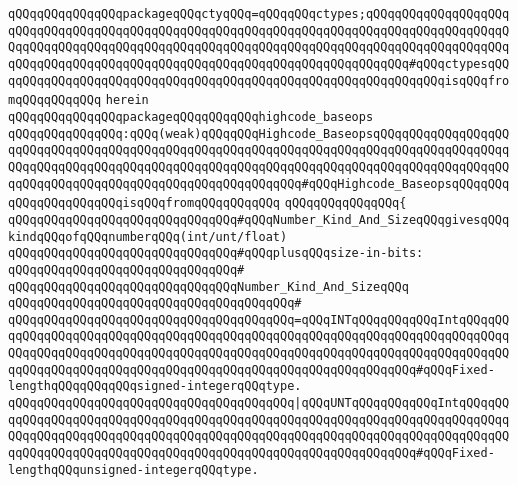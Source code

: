 \verb|qQQqqQQqqQQqqQQqpackageqQQqctyqQQq=qQQqqQQqctypes;qQQqqQQqqQQqqQQqqQQqqQQqqQQqqQQqqQQqqQQqqQQqqQQqqQQqqQQqqQQqqQQqqQQqqQQqqQQqqQQqqQQqqQQqqQQqqQQqqQQqqQQqqQQqqQQqqQQqqQQqqQQqqQQqqQQqqQQqqQQqqQQqqQQqqQQqqQQqqQQqqQQqqQQqqQQqqQQqqQQqqQQqqQQqqQQqqQQqqQQqqQQqqQQqqQQqqQQq#qQQqctypesqQQqqQQqqQQqqQQqqQQqqQQqqQQqqQQqqQQqqQQqqQQqqQQqqQQqqQQqqQQqqQQqisqQQqfromqQQqqQQqqQQq|\newline
\verb|herein|\newline
\newline
\verb|qQQqqQQqqQQqqQQqpackageqQQqqQQqqQQqhighcode_baseops|\newline
\verb|qQQqqQQqqQQqqQQq:qQQq(weak)qQQqqQQqHighcode_BaseopsqQQqqQQqqQQqqQQqqQQqqQQqqQQqqQQqqQQqqQQqqQQqqQQqqQQqqQQqqQQqqQQqqQQqqQQqqQQqqQQqqQQqqQQqqQQqqQQqqQQqqQQqqQQqqQQqqQQqqQQqqQQqqQQqqQQqqQQqqQQqqQQqqQQqqQQqqQQqqQQqqQQqqQQqqQQqqQQqqQQqqQQqqQQqqQQqqQQqqQQq#qQQqHighcode_BaseopsqQQqqQQqqQQqqQQqqQQqqQQqisqQQqfromqQQqqQQqqQQq|\newline
\verb|qQQqqQQqqQQqqQQq{|\newline
\verb|qQQqqQQqqQQqqQQqqQQqqQQqqQQqqQQq#qQQqNumber_Kind_And_SizeqQQqgivesqQQqkindqQQqofqQQqnumberqQQq(int/unt/float)|\newline
\verb|qQQqqQQqqQQqqQQqqQQqqQQqqQQqqQQq#qQQqplusqQQqsize-in-bits:|\newline
\verb|qQQqqQQqqQQqqQQqqQQqqQQqqQQqqQQq#|\newline
\verb|qQQqqQQqqQQqqQQqqQQqqQQqqQQqqQQqNumber_Kind_And_SizeqQQq|\newline
\verb|qQQqqQQqqQQqqQQqqQQqqQQqqQQqqQQqqQQqqQQq#|\newline
\verb|qQQqqQQqqQQqqQQqqQQqqQQqqQQqqQQqqQQqqQQq=qQQqINTqQQqqQQqqQQqIntqQQqqQQqqQQqqQQqqQQqqQQqqQQqqQQqqQQqqQQqqQQqqQQqqQQqqQQqqQQqqQQqqQQqqQQqqQQqqQQqqQQqqQQqqQQqqQQqqQQqqQQqqQQqqQQqqQQqqQQqqQQqqQQqqQQqqQQqqQQqqQQqqQQqqQQqqQQqqQQqqQQqqQQqqQQqqQQqqQQqqQQqqQQqqQQqqQQqqQQqqQQq#qQQqFixed-lengthqQQqqQQqqQQqsigned-integerqQQqtype.|\newline
\verb|qQQqqQQqqQQqqQQqqQQqqQQqqQQqqQQqqQQqqQQq|\verb#|qQQqUNTqQQqqQQqqQQqIntqQQqqQQqqQQqqQQqqQQqqQQqqQQqqQQqqQQqqQQqqQQqqQQqqQQqqQQqqQQqqQQqqQQqqQQqqQQqqQQqqQQqqQQqqQQqqQQqqQQqqQQqqQQqqQQqqQQqqQQqqQQqqQQqqQQqqQQqqQQqqQQqqQQqqQQqqQQqqQQqqQQqqQQqqQQqqQQqqQQqqQQqqQQqqQQqqQQqqQQqqQQq#\verb|#qQQqFixed-lengthqQQqunsigned-integerqQQqtype.|\newline

